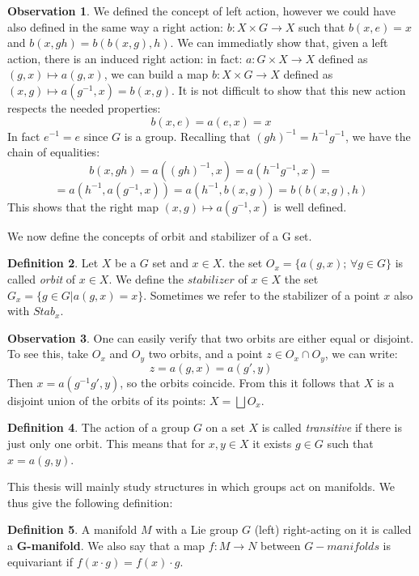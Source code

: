 \documentclass[12pt,a4paper]{report}
\theoremstyle{definition}
\newtheorem{Def}{Definition}[chapter]
\theoremstyle{Theorem}
\theoremstyle{definition}
\theoremstyle{definition}
\newtheorem{Obs}[Def]{Observation}
\begin{document}
		\begin{Obs}
			We defined the concept of left action, however we could have also defined in the same way a right action: $b:X\times G\rightarrow X$ such that $b(x,e)=x$ and $b(x,gh)=b(b(x,g),h)$. We can immediatly show that, given a left action, there is an induced right action: in fact: $a:G\times X\rightarrow X$ defined as $(g,x)\longmapsto a(g,x)$, we can build a map $b:X\times G\rightarrow X$ defined as $(x,g)\longmapsto a(g^{-1},x)=b(x,g)$. 
			It is not difficult to show that this new action respects the needed properties:
			$$b(x,e)=a(e,x)=x$$
			In fact $e^{-1}=e$ since $G$ is a group. Recalling that $(gh)^{-1}=h^{-1}g^{-1}$, we have the chain of equalities:
			$$b(x,gh)=a((gh)^{-1},x)=a(h^{-1}g^{-1},x)=$$$$=a(h^{-1},a(g^{-1},x))=a(h^{-1},b(x,g))=b(b(x,g),h)$$
			This shows that the right map $(x,g)\longmapsto a(g^{-1},x)$ is well defined.
		\end{Obs}
		We now define the concepts of orbit and stabilizer of a G set.
		\begin{Def}
			Let $X$ be a $G$ set and $x\in X$. the set $O_x=\{a(g,x); \, \forall g\in G\}$ is called \textit{orbit} of $x\in X$. We define the $\textit{stabilizer}$ of $x\in X$ the set $G_x=\{g\in G|a(g,x)=x\}$. Sometimes we refer to the stabilizer of a point $x$ also with $Stab_x$.
		\end{Def}
		\begin{Obs} \label{Obs: 2.1}
			One can easily verify that two orbits are either equal or disjoint. To see this, take $O_x$ and $O_y$ two orbits, and a point $z\in O_x\cap O_y$, we can write:
			$$z=a(g,x)=a(g',y)$$
			Then $x=a(g^{-1}g',y)$, so the orbits coincide.
			From this it follows that $X$ is a disjoint union of the orbits of its points: $X=\bigsqcup O_x$.
		\end{Obs}
		\begin{Def}
			The action of a group $G$ on a set $X$ is called \textit{transitive} if there is just only one orbit. This means that for $x,y\in X$ it exists $g\in G$ such that $x=a(g,y)$.
		\end{Def}
		This thesis will mainly study structures in which groups act on manifolds. We thus give the following definition:
		\begin{Def}
			A manifold $M$ with a Lie group $G$ (left) right-acting on it is called a \textbf{G-manifold}. We also say that a map $f:M\rightarrow N$ between $G-manifolds$ is equivariant if $f(x\cdot g)=f(x)\cdot g$.
		\end{Def}		
\end{document}
